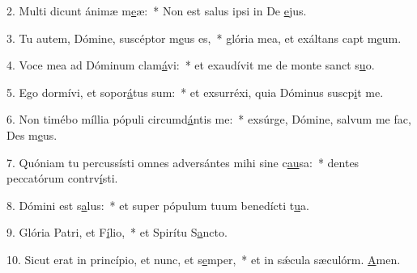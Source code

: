 2. Multi dicunt ánimæ m\uline{e}æ:~* Non est salus ipsi in De \uline{e}jus.\par 
3. Tu autem, Dómine, suscéptor m\uline{e}us es,~* glória mea, et exáltans capt m\uline{e}um.\par 
4. Voce mea ad Dóminum clam\uline{á}vi:~* et exaudívit me de monte sanct s\uline{u}o.\par 
5. Ego dormívi, et sopor\uline{á}tus sum:~* et exsurréxi, quia Dóminus suscp\uline{i}t me.\par 
6. Non timébo míllia pópuli circumd\uline{á}ntis me:~* exsúrge, Dómine, salvum me fac, Des m\uline{e}us.\par 
7. Quóniam tu percussísti omnes adversántes mihi sine c\uline{au}sa:~* dentes peccatórum contrv\uline{í}sti.\par 
8. Dómini est s\uline{a}lus:~* et super pópulum tuum benedícti t\uline{u}a.\par 
9. Glória Patri, et F\uline{í}lio,~* et Spirítu S\uline{a}ncto.\par 
10. Sicut erat in princípio, et nunc, et s\uline{e}mper,~* et in sǽcula sæculórm. \uline{A}men.\par 
